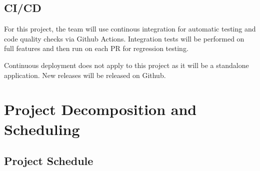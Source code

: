 \documentclass{article}
\begin{document}
\subsection{CI/CD}

For this project, the team will use continous integration for automatic testing and code quality checks via Github Actions. 
Integration tests will be performed on full features and then run on each PR for regression testing. 

Continuous deployment does not apply to this project as it will be a standalone application. New releases will
be released on Github.
\section{Project Decomposition and Scheduling}

\subsection{Project Schedule}
\end{document}
